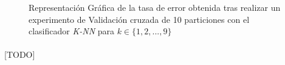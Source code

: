 \documentclass{article}
\begin{document}
		\begin{figure}[h]
			\begin{center}
			\end{center}
			\caption{Representación Gráfica de la tasa de error obtenida tras realizar un experimento de Validación cruzada de 10 particiones con el clasificador \emph{K-NN} para $k \in \{1,2,...,9\}$}
			\label{plot:e2}
		\end{figure}

		\paragraph{}
		[TODO]


	\nocite{garciparedes:machine-learning-instance-based}
	\nocite{subject:taa}
	\nocite{tool:weka}
  
  
\end{document}
